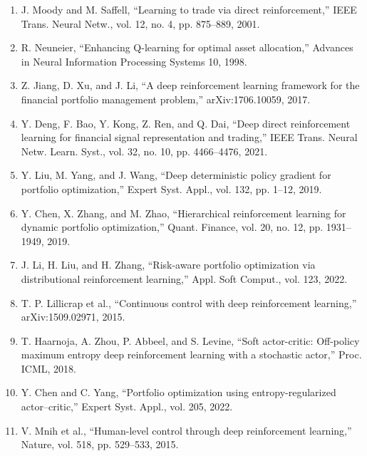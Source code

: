 \documentclass[11pt]{article}
\begin{document}
\begin{enumerate}
\item J. Moody and M. Saffell, ``Learning to trade via direct reinforcement,'' IEEE Trans. Neural Netw., vol. 12, no. 4, pp. 875--889, 2001.

\item R. Neuneier, ``Enhancing Q-learning for optimal asset allocation,'' Advances in Neural Information Processing Systems 10, 1998.

\item Z. Jiang, D. Xu, and J. Li, ``A deep reinforcement learning framework for the financial portfolio management problem,'' arXiv:1706.10059, 2017.

\item Y. Deng, F. Bao, Y. Kong, Z. Ren, and Q. Dai, ``Deep direct reinforcement learning for financial signal representation and trading,'' IEEE Trans. Neural Netw. Learn. Syst., vol. 32, no. 10, pp. 4466--4476, 2021.

\item Y. Liu, M. Yang, and J. Wang, ``Deep deterministic policy gradient for portfolio optimization,'' Expert Syst. Appl., vol. 132, pp. 1--12, 2019.

\item Y. Chen, X. Zhang, and M. Zhao, ``Hierarchical reinforcement learning for dynamic portfolio optimization,'' Quant. Finance, vol. 20, no. 12, pp. 1931--1949, 2019.

\item J. Li, H. Liu, and H. Zhang, ``Risk-aware portfolio optimization via distributional reinforcement learning,'' Appl. Soft Comput., vol. 123, 2022.

\item T. P. Lillicrap et al., ``Continuous control with deep reinforcement learning,'' arXiv:1509.02971, 2015.

\item T. Haarnoja, A. Zhou, P. Abbeel, and S. Levine, ``Soft actor-critic: Off-policy maximum entropy deep reinforcement learning with a stochastic actor,'' Proc. ICML, 2018.

\item Y. Chen and C. Yang, ``Portfolio optimization using entropy-regularized actor--critic,'' Expert Syst. Appl., vol. 205, 2022.

\item V. Mnih et al., ``Human-level control through deep reinforcement learning,'' Nature, vol. 518, pp. 529--533, 2015.


\end{enumerate}
\end{document}
